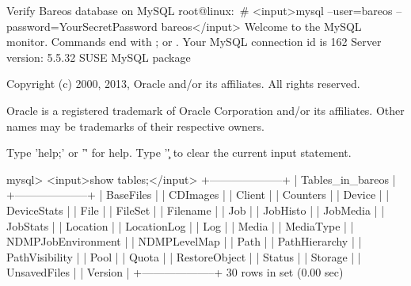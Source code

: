 \begin{commands}{Verify Bareos database on MySQL}
root@linux:~# <input>mysql --user=bareos --password=YourSecretPassword bareos</input>
Welcome to the MySQL monitor.  Commands end with ; or \g.
Your MySQL connection id is 162
Server version: 5.5.32 SUSE MySQL package

Copyright (c) 2000, 2013, Oracle and/or its affiliates. All rights reserved.

Oracle is a registered trademark of Oracle Corporation and/or its
affiliates. Other names may be trademarks of their respective
owners.

Type 'help;' or '\h' for help. Type '\c' to clear the current input statement.

mysql> <input>show tables;</input>
+--------------------+
| Tables_in_bareos   |
+--------------------+
| BaseFiles          |
| CDImages           |
| Client             |
| Counters           |
| Device             |
| DeviceStats        |
| File               |
| FileSet            |
| Filename           |
| Job                |
| JobHisto           |
| JobMedia           |
| JobStats           |
| Location           |
| LocationLog        |
| Log                |
| Media              |
| MediaType          |
| NDMPJobEnvironment |
| NDMPLevelMap       |
| Path               |
| PathHierarchy      |
| PathVisibility     |
| Pool               |
| Quota              |
| RestoreObject      |
| Status             |
| Storage            |
| UnsavedFiles       |
| Version            |
+--------------------+
30 rows in set (0.00 sec)


\end{commands}
